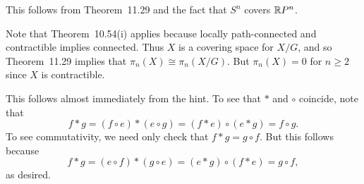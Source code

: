 \documentclass[../../solutions.tex]{subfiles}
\begin{document}
\begin{exercise} \leavevmode
This follows from Theorem~11.29 and the fact that $S^n$ covers $\mathbb{R} P^n$.
\end{exercise}

\begin{exercise} \leavevmode
Note that Theorem~10.54(i) applies because locally path-connected and contractible implies connected.
Thus $X$ is a covering space for $X/G$, and so Theorem~11.29 implies that $\pi_n(X)\cong\pi_n(X/G)$.
But $\pi_n(X)=0$ for $n\ge2$ since $X$ is contractible.
\end{exercise}

\begin{exercise} \leavevmode
This follows almost immediately from the hint.
To see that $*$ and $\circ$ coincide, note that
\[f*g=(f\circ e)*(e\circ g)=(f*e)\circ(e*g)=f\circ g.\]
To see commutativity, we need only check that $f*g=g\circ f$.
But this follows because
\[f*g=(e\circ f)*(g\circ e)=(e*g)\circ(f*e)=g\circ f,\]
as desired.
\end{exercise}
\end{document}
